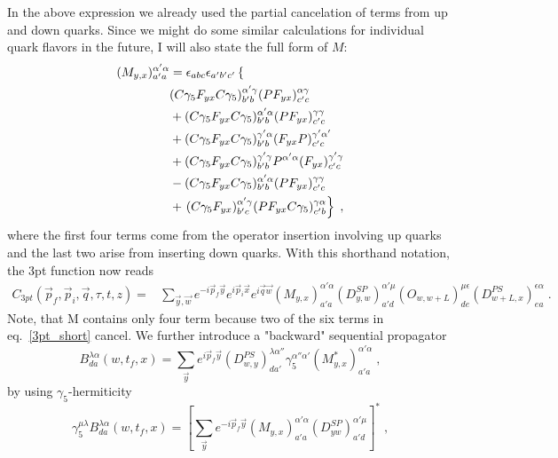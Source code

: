 \documentclass[a4paper,10pt]{scrartcl}
\begin{document}
In the above expression we already used the partial cancelation of terms from up and down quarks. Since we might do some similar calculations for individual 
quark flavors in the future, I will also state the full form of $M$:
\begin{align}
    (M_{y,x})^{\alpha' \alpha}_{a'a} &= \epsilon_{abc} \epsilon_{a'b'c'} \left \lbrace \notag \right. \\
    & (C\gamma_5F_{yx}C\gamma_5)^{\alpha' \gamma}_{b'b} (PF_{yx})^{\alpha \gamma}_{c'c} \notag \\
    & + (C\gamma_5F_{yx}C\gamma_5)^{\alpha' \alpha}_{b'b} (PF_{yx})^{\gamma \gamma}_{c'c} \notag \\
    & + (C\gamma_5F_{yx}C\gamma_5)^{\gamma' \alpha}_{b'b} (F_{yx}P)^{\gamma' \alpha'}_{c'c} \notag \\
    & + (C\gamma_5F_{yx}C\gamma_5)^{\gamma' \gamma}_{b'b} P^{\alpha' \alpha} (F_{yx})^{\gamma' \gamma}_{c'c} \notag \\
    & - (C\gamma_5F_{yx}C\gamma_5)^{\alpha' \alpha}_{b'b} (PF_{yx})^{\gamma \gamma}_{c'c} \notag \\
    & +\left. (C\gamma_5F_{yx})^{\alpha' \gamma}_{b'c} (PF_{yx}C\gamma_5)^{\gamma \alpha}_{c'b} \right \rbrace \;, \notag 
\end{align}
where the first four terms come from the operator insertion involving up quarks and the last two arise from inserting down quarks. With this shorthand notation, the 3pt function now reads
\begin{align}
    C_{3pt}(\vec p_f, \vec p_i, \vec q, \tau, t, z) =& \sum_{\vec y, \vec w} e^{-i \vec p_f \vec y} e^{i \vec p_i \vec x} e^{i \vec q \vec w} 
    (M_{y,x})^{\alpha' \alpha}_{a'a} (D^{SP}_{y,w})^{\alpha' \mu}_{a'd} (O_{w,w+L})^{\mu \epsilon}_{de} (D^{PS}_{w+L,x})^{\epsilon \alpha}_{ea} \; .
\end{align}
Note, that M contains only four term because two of the six terms in eq.~\eqref{3pt_short} cancel. We further introduce a "backward" sequential propagator
\begin{equation}
    B^{\lambda \alpha}_{da}(w,t_f,x) = \sum_{\vec y} e^{i \vec p_f \vec y} (D_{w,y}^{PS})^{\lambda\alpha''}_{da'} \gamma_5^{\alpha''\alpha'} (M_{y,x}^*)^{\alpha' \alpha}_{a'a} \; ,
\end{equation}
by using $\gamma_5$-hermiticity
\begin{equation}
    \gamma_5^{\mu \lambda} B^{\lambda \alpha}_{da}(w,t_f,x) = \left[\sum_{\vec y} e^{-i \vec p_f \vec y} (M_{y,x})^{\alpha' \alpha}_{a'a}
    (D^{SP}_{yw})^{\alpha' \mu}_{a'd} \right]^* \; ,
\end{equation}
\end{document}
